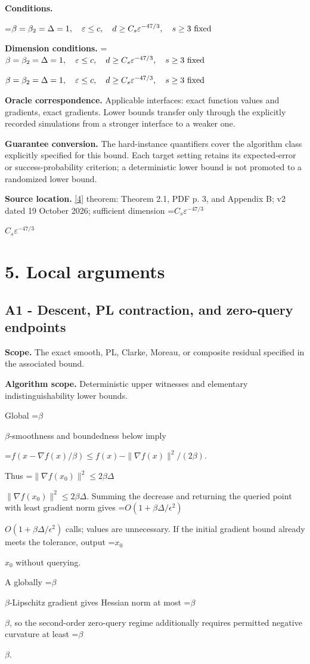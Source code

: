 \documentclass[10pt,a4paper]{article}
\newcommand{\AtlasMath}[1]{\par\begingroup\centering\setbox0=\hbox{$\displaystyle #1$}\ifdim\wd0>1.4\linewidth\typeout{ATLAS WIDE FORMULA: \the\wd0}\fi\ifdim\wd0>\linewidth\resizebox{\linewidth}{!}{\box0}\else\box0\fi\par\endgroup}
\newcommand{\AtlasInlineMath}[1]{\begingroup\setbox0=\hbox{$#1$}\ifdim\wd0>.4\linewidth\endgroup\AtlasMath{#1}\else\endgroup$#1$\fi}
\begin{document}
\textbf{Conditions.} 
\AtlasMath{\beta=\beta_2=\Delta=1,\quad\varepsilon\le c,\quad d\ge C_s\varepsilon^{-47/3},\quad s\ge3\text{ \text{fixed}}}


\textbf{Dimension conditions.} \AtlasInlineMath{\beta=\beta_2=\Delta=1,\quad\varepsilon\le c,\quad d\ge C_s\varepsilon^{-47/3},\quad s\ge3\text{ \text{fixed}}}

\textbf{Oracle correspondence.} Applicable interfaces: exact function values and gradients, exact gradients. Lower bounds transfer only through the explicitly recorded simulations from a stronger interface to a weaker one.

\textbf{Guarantee conversion.} The hard-instance quantifiers cover the algorithm class explicitly specified for this bound. Each target setting retains its expected-error or success-probability criterion; a deterministic lower bound is not promoted to a randomized lower bound.

\textbf{Source location.} \href{https://arxiv.org/pdf/2610.17074v2}{[4]} theorem: Theorem 2.1, PDF p. 3, and Appendix B; v2 dated 19 October 2026; sufficient dimension \AtlasInlineMath{C_s\varepsilon^{-47/3}}

\section{5. Local arguments}
\subsection{A1 - Descent, PL contraction, and zero-query endpoints}
\textbf{Scope.} The exact smooth, PL, Clarke, Moreau, or composite residual specified in the associated bound.

\textbf{Algorithm scope.} Deterministic upper witnesses and elementary indistinguishability lower bounds.

Global \AtlasInlineMath{\beta}-smoothness and boundedness below imply

\AtlasMath{f(x-\nabla f(x)/\beta)\le f(x)-\|\nabla f(x)\|^2/(2\beta).}

Thus \AtlasInlineMath{\|\nabla f(x_0)\|^2\le2\beta\Delta}. Summing the decrease and returning the queried point with least gradient norm gives \AtlasInlineMath{O(1+\beta\Delta/\epsilon^2)} calls; values are unnecessary. If the initial gradient bound already meets the tolerance, output \AtlasInlineMath{x_0} without querying.

A globally \AtlasInlineMath{\beta}-Lipschitz gradient gives Hessian norm at most \AtlasInlineMath{\beta}, so the second-order zero-query regime additionally requires permitted negative curvature at least \AtlasInlineMath{\beta}.
\end{document}
